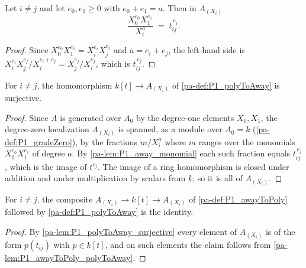 \begin{lemma}
  \label{pa-lem:P1_away_monomial}
  \leanok

  Let \(i \neq j\) and let \(e_0, e_1 \ge 0\) with \(e_0 + e_1 = a\). Then in \(A_{(X_i)}\)
  \[
    \frac{X_0^{e_0} X_1^{e_1}}{X_i^{a}} \;=\; t_{ij}^{\,e_j}.
  \]
\end{lemma}
\begin{proof}
  \leanok
  Since \(X_0^{e_0} X_1^{e_1} = X_i^{e_i} X_j^{e_j}\) and \(a = e_i + e_j\), the left-hand
  side is \(X_i^{e_i} X_j^{e_j} / X_i^{e_i + e_j} = X_j^{e_j} / X_i^{e_j}\), which is
  \(t_{ij}^{\,e_j}\).
\end{proof}

\begin{lemma}
  \label{pa-lem:P1_polyToAway_surjective}
  \leanok

  For \(i \neq j\), the homomorphism \(k[t] \to A_{(X_i)}\) of \ref{pa-def:P1_polyToAway} is
  surjective.
\end{lemma}
\begin{proof}
  \leanok
  Since \(A\) is generated over \(A_0\) by the degree-one elements \(X_0, X_1\), the
  degree-zero localization \(A_{(X_i)}\) is spanned, as a module over \(A_0 = k\)
  (\ref{pa-def:P1_gradeZero}), by the fractions \(m / X_i^a\) where \(m\) ranges over the
  monomials \(X_0^{e_0} X_1^{e_1}\) of degree \(a\). By \ref{pa-lem:P1_away_monomial} each such
  fraction equals \(t_{ij}^{\,e_j}\), which is the image of \(t^{e_j}\). The image of a ring
  homomorphism is closed under addition and under multiplication by scalars from \(k\), so it
  is all of \(A_{(X_i)}\).
\end{proof}

\begin{lemma}
  \label{pa-lem:P1_polyToAway_awayToPoly}
  \leanok

  For \(i \neq j\), the composite \(A_{(X_i)} \to k[t] \to A_{(X_i)}\) of
  \ref{pa-def:P1_awayToPoly} followed by \ref{pa-def:P1_polyToAway} is the identity.
\end{lemma}
\begin{proof}
  \leanok
  By \ref{pa-lem:P1_polyToAway_surjective} every element of \(A_{(X_i)}\) is of the form
  \(p(t_{ij})\) with \(p \in k[t]\), and on such elements the claim follows from
  \ref{pa-lem:P1_awayToPoly_polyToAway}.
\end{proof}

